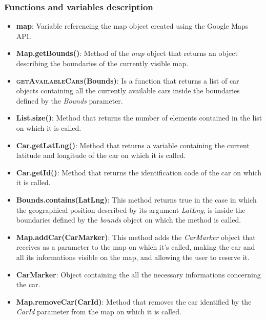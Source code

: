 \subsubsection{Functions and variables description}
\begin{itemize}
	\item \textbf{map}: Variable referencing the map object created using the Google Maps API.
	\item \textbf{Map.getBounds()}: Method of the \textit{map} object that returns an object describing
                                  the boundaries of the currently visible map.
	\item \textbf{\textsc{getAvailableCars}(Bounds)}: Is a function that returns a list of car objects
                                                    containing all the currently available cars
                                                    inside the boundaries defined by the
                                                    \textit{Bounds} parameter.
	\item \textbf{List.size()}: Method that returns the number of elements contained in the list on which
                              it is called.
	\item \textbf{Car.getLatLng()}: Method that returns a variable containing the current latitude and
                                  longitude of the car on which it is called.
	\item \textbf{Car.getId()}: Method that returns the identification code of the car on which it is
                              called.
	\item \textbf{Bounds.contains(LatLng)}: This method returns true in the case in which the
                                          geographical position described by its argument
                                          \textit{LatLng}, is inside the boundaries defined by
                                          the \textit{bounds} object on which the method is called.
	\item \textbf{Map.addCar(CarMarker)}: This method adds the \textit{CarMarker} object that receives
                                        as a parameter to the map on which it's called, making the car
                                        and all its informations visible on the map, and allowing the
                                        user to reserve it.
	\item \textbf{CarMarker}: Object containing the all the necessary informations concerning the car.
	\item \textbf{Map.removeCar(CarId)}: Method that removes the car identified by the \textit{CarId}
                                       parameter from the map on which it is called.
\end{itemize}

